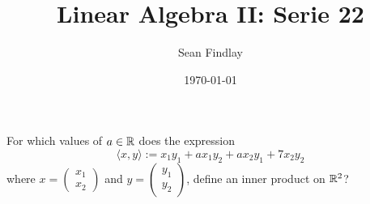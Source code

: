 \documentclass[12pt]{article}
\title{Linear Algebra II: Serie 22}
\author{Sean Findlay}
\date{\today}
\begin{document}
\maketitle

\begin{problem}{}{}
    For which values of $a \in \mathbb{R}$ does the expression
    $$
        \langle x, y \rangle := x_1y_1 + ax_1y_2 + ax_2y_1 + 7x_2y_2
    $$
    where $x = \begin{pmatrix} x_1 \\ x_2 \end{pmatrix}$ and $y = \begin{pmatrix} y_1 \\ y_2 \end{pmatrix}$, define an inner product on $\mathbb{R}^2$?
\end{problem}
\end{document}
